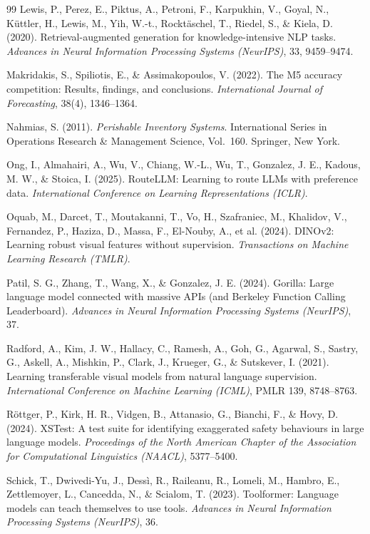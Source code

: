 \begin{thebibliography}{99}
Lewis, P., Perez, E., Piktus, A., Petroni, F., Karpukhin, V., Goyal, N., K\"uttler, H., Lewis, M., Yih, W.-t., Rockt\"aschel, T., Riedel, S., \& Kiela, D. (2020).
Retrieval-augmented generation for knowledge-intensive NLP tasks.
\textit{Advances in Neural Information Processing Systems (NeurIPS)}, 33, 9459--9474.

Makridakis, S., Spiliotis, E., \& Assimakopoulos, V. (2022).
The M5 accuracy competition: Results, findings, and conclusions.
\textit{International Journal of Forecasting}, 38(4), 1346--1364.

Nahmias, S. (2011).
\textit{Perishable Inventory Systems}.
International Series in Operations Research \& Management Science, Vol.~160. Springer, New York.

Ong, I., Almahairi, A., Wu, V., Chiang, W.-L., Wu, T., Gonzalez, J. E., Kadous, M. W., \& Stoica, I. (2025).
RouteLLM: Learning to route LLMs with preference data.
\textit{International Conference on Learning Representations (ICLR)}.

Oquab, M., Darcet, T., Moutakanni, T., Vo, H., Szafraniec, M., Khalidov, V., Fernandez, P., Haziza, D., Massa, F., El-Nouby, A., et al. (2024).
DINOv2: Learning robust visual features without supervision.
\textit{Transactions on Machine Learning Research (TMLR)}.

Patil, S. G., Zhang, T., Wang, X., \& Gonzalez, J. E. (2024).
Gorilla: Large language model connected with massive APIs (and Berkeley Function Calling Leaderboard).
\textit{Advances in Neural Information Processing Systems (NeurIPS)}, 37.

Radford, A., Kim, J. W., Hallacy, C., Ramesh, A., Goh, G., Agarwal, S., Sastry, G., Askell, A., Mishkin, P., Clark, J., Krueger, G., \& Sutskever, I. (2021).
Learning transferable visual models from natural language supervision.
\textit{International Conference on Machine Learning (ICML)}, PMLR 139, 8748--8763.

R\"ottger, P., Kirk, H. R., Vidgen, B., Attanasio, G., Bianchi, F., \& Hovy, D. (2024).
XSTest: A test suite for identifying exaggerated safety behaviours in large language models.
\textit{Proceedings of the North American Chapter of the Association for Computational Linguistics (NAACL)}, 5377--5400.

Schick, T., Dwivedi-Yu, J., Dess\`i, R., Raileanu, R., Lomeli, M., Hambro, E., Zettlemoyer, L., Cancedda, N., \& Scialom, T. (2023).
Toolformer: Language models can teach themselves to use tools.
\textit{Advances in Neural Information Processing Systems (NeurIPS)}, 36.


\end{thebibliography}
